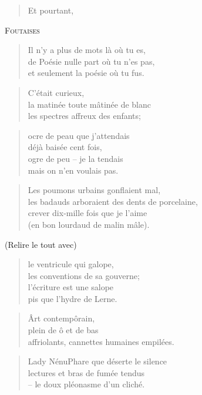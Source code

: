   \begin{verse}
    Et pourtant,
  \end{verse}
  \begin{center}
    \textsc{Foutaises}
  \end{center}
  \begin{verse}
    Il n’y a plus de mots là où tu es,\\
    de Poésie nulle part où tu n’es pas,\\
    et seulement la poésie où tu fus.
  \end{verse}
  \begin{verse}
    C’était curieux,\\
    la matinée toute mâtinée de blanc\\
    les spectres affreux des enfants;
  \end{verse}
  \begin{verse}
    ocre de peau que j’attendais\\
    déjà baisée cent fois,\\
    ogre de peu -- je la tendais\\
    mais on n’en voulais pas.
  \end{verse}
  \begin{verse}
    Les poumons urbains gonflaient mal,\\
    les badauds arboraient des dents de porcelaine,\\
    crever dix-mille fois que je l’aime\\
    (en bon lourdaud de malin mâle).
  \end{verse}
  \begin{center}
    (Relire le tout avec)
  \end{center}
  \begin{verse}
    le ventricule qui galope,\\
    les conventions de sa gouverne;\\
    l’écriture est une salope\\
    pis que l’hydre de Lerne.
  \end{verse}
  \begin{verse}
    Ârt contempôrain,\\
    plein de ô et de bas\\
    affriolants, cannettes humaines empilées.
  \end{verse}
  \begin{verse}
    Lady NénuPhare que déserte le silence\\
    lectures et bras de fumée tendus\\
    -- le doux pléonasme d’un cliché.
  \end{verse}
